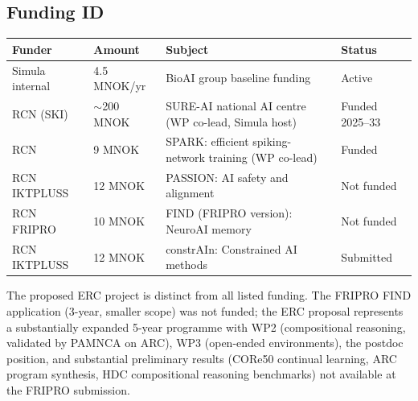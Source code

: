 \subsection*{Funding ID}

\begin{tabular}{p{3cm}p{3cm}p{6cm}p{2cm}}
\toprule
\textbf{Funder} & \textbf{Amount} & \textbf{Subject} & \textbf{Status} \\
\midrule
Simula internal & 4.5 MNOK/yr & BioAI group baseline funding & Active \\
RCN (SKI) & $\sim$200 MNOK & SURE-AI national AI centre (WP co-lead, Simula host) & Funded 2025--33 \\
RCN & 9 MNOK & SPARK: efficient spiking-network training (WP co-lead) & Funded \\
RCN IKTPLUSS & 12 MNOK & PASSION: AI safety and alignment & Not funded \\
RCN FRIPRO & 10 MNOK & FIND (FRIPRO version): NeuroAI memory & Not funded \\
RCN IKTPLUSS & 12 MNOK & constrAIn: Constrained AI methods & Submitted \\
\bottomrule
\end{tabular}

\noindent The proposed ERC project is distinct from all listed funding. The FRIPRO FIND application (3-year, smaller scope) was not funded; the ERC proposal represents a substantially expanded 5-year programme with WP2 (compositional reasoning, validated by PAMNCA on ARC), WP3 (open-ended environments), the postdoc position, and substantial preliminary results (CORe50 continual learning, ARC program synthesis, HDC compositional reasoning benchmarks) not available at the FRIPRO submission.

\printbibliography[title={References}]
